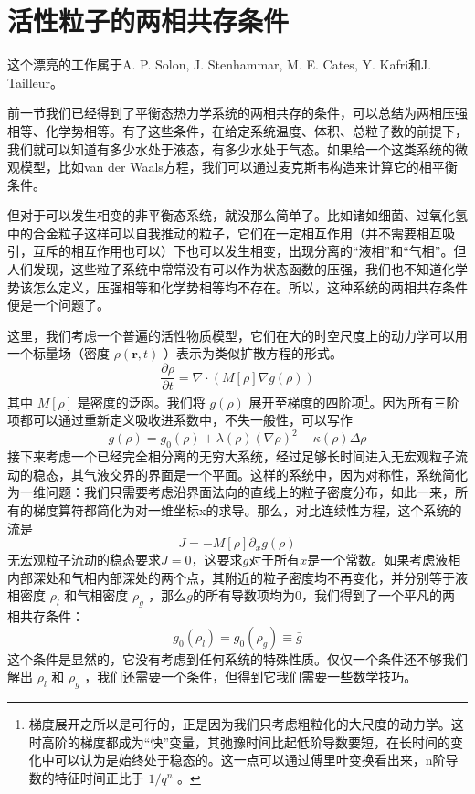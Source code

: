 \documentclass{ctexart}
\begin{document}
\section{活性粒子的两相共存条件}
这个漂亮的工作属于A. P. Solon, J. Stenhammar, M. E. Cates, Y. Kafri和J. Tailleur。

前一节我们已经得到了平衡态热力学系统的两相共存的条件，可以总结为两相压强相等、化学势相等。有了这些条件，在给定系统温度、体积、总粒子数的前提下，我们就可以知道有多少水处于液态，有多少水处于气态。如果给一个这类系统的微观模型，比如van der Waals方程，我们可以通过麦克斯韦构造来计算它的相平衡条件。

但对于可以发生相变的非平衡态系统，就没那么简单了。比如诸如细菌、过氧化氢中的合金粒子这样可以自我推动的粒子，它们在一定相互作用（并不需要相互吸引，互斥的相互作用也可以）下也可以发生相变，出现分离的“液相”和“气相”。但人们发现，这些粒子系统中常常没有可以作为状态函数的压强，我们也不知道化学势该怎么定义，压强相等和化学势相等均不存在。所以，这种系统的两相共存条件便是一个问题了。

这里，我们考虑一个普遍的活性物质模型，它们在大的时空尺度上的动力学可以用一个标量场（密度 $\rho(\bm{r},t)$ ）表示为类似扩散方程的形式。
\begin{equation}
\frac{\partial\rho}{\partial t}=\nabla\cdot(M[\rho]\nabla g(\rho))
\end{equation}
其中 $M[\rho]$ 是密度的泛函。我们将 $g(\rho)$ 展开至梯度的四阶项\footnote{梯度展开之所以是可行的，正是因为我们只考虑粗粒化的大尺度的动力学。这时高阶的梯度都成为“快”变量，其弛豫时间比起低阶导数要短，在长时间的变化中可以认为是始终处于稳态的。这一点可以通过傅里叶变换看出来，n阶导数的特征时间正比于 $1/q^n$ 。}。因为所有三阶项都可以通过重新定义吸收进系数中，不失一般性，可以写作
\begin{equation}
g(\rho)=g_0(\rho)+\lambda(\rho)(\nabla\rho)^2-\kappa(\rho)\Delta\rho
\end{equation}
接下来考虑一个已经完全相分离的无穷大系统，经过足够长时间进入无宏观粒子流动的稳态，其气液交界的界面是一个平面。这样的系统中，因为对称性，系统简化为一维问题：我们只需要考虑沿界面法向的直线上的粒子密度分布，如此一来，所有的梯度算符都简化为对一维坐标x的求导。那么，对比连续性方程，这个系统的流是
\begin{equation}
J=-M[\rho]\partial_xg(\rho)
\end{equation}
无宏观粒子流动的稳态要求$J=0$，这要求$g$对于所有$x$是一个常数。如果考虑液相内部深处和气相内部深处的两个点，其附近的粒子密度均不再变化，并分别等于液相密度 $\rho_l$ 和气相密度 $\rho_g$ ，那么$g$的所有导数项均为0，我们得到了一个平凡的两相共存条件：
\begin{equation}
g_0(\rho_l)=g_0(\rho_g)\equiv\bar{g}
\end{equation}
这个条件是显然的，它没有考虑到任何系统的特殊性质。仅仅一个条件还不够我们解出 $\rho_l$ 和 $\rho_g$ ，我们还需要一个条件，但得到它我们需要一些数学技巧。
\end{document}
